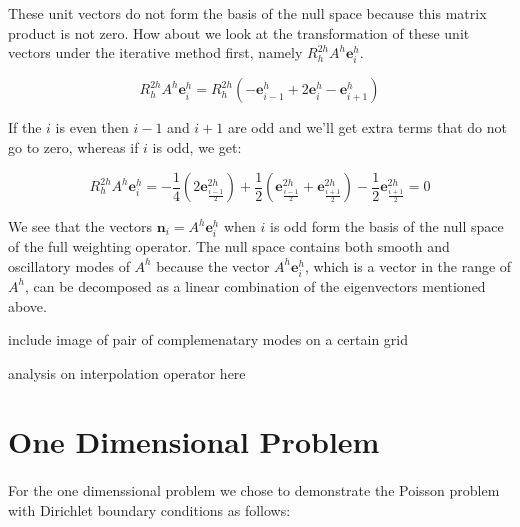 \documentclass[pdftex,12pt,a4paper]{article}
\begin{document}
These unit vectors do not form the basis of the null space because this matrix product is not zero.  How about we look at the transformation of these unit vectors under the iterative method first, namely  $R_h^{2h}A^h \mathbf{e}_i^h$.  

\begin{equation}
R_h^{2h}A^h \mathbf{e}_i^h = R_h^{2h} \left( - \mathbf{e}_{i-1}^h + 2 \mathbf{e}_{i}^h - \mathbf{e}_{i+1}^h \right)
\end{equation}

If the $i$ is even then $i-1$ and $i+1$ are odd and we'll get extra terms that do not go to zero, whereas if $i$ is odd, we get: 

\begin{equation}
R_h^{2h}A^h \mathbf{e}_i^h =  -\frac 1 4 \left( 2 \mathbf{e}_{\frac{i-1}{2}}^{2h} \right) + \frac 1 2 \left( \mathbf{e}_{\frac{i-1}{2}}^{2h} + \mathbf{e}_{\frac{i+1}{2}}^{2h} \right) - \frac 1 2 \mathbf{e}_{ \frac{i+1}{2}}^{2h} = 0 
\end{equation}

We see that the vectors $\mathbf{n}_i = A^h \mathbf{e}_i^h$ when $i$ is odd form the basis of the null space of the full weighting operator.  The null space contains both smooth and oscillatory modes of $A^h$ because the vector $A^h \mathbf{e}_i^h$, which is a vector in the range of $A^h$, can be decomposed as a linear combination of the eigenvectors mentioned above.  






include image of pair of complemenatary modes on a certain grid


analysis on interpolation operator here














\section{One Dimensional Problem}
    
    \paragraph*{} For the one dimenssional problem we chose to demonstrate the Poisson problem with Dirichlet boundary conditions as follows:
    
\end{document}
